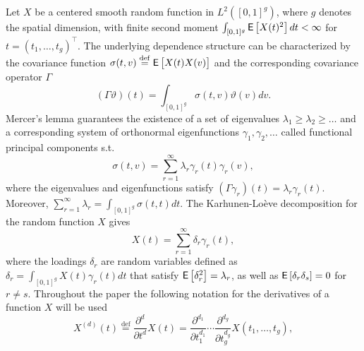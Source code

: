 Let $X$ be a centered smooth random function in $L^2([0,1]^g)$, where $g$ denotes the spatial dimension, with finite second moment $\int_{[0,1]^g} \mathop{\mbox{\sf E}}\left[X(t)^2 \right]dt < \infty$ for $t=(t_1, \ldots, t_g)^{\top}$. %
The underlying dependence structure can  be characterized by the covariance function $\sigma(t,v)\stackrel{\operatorname{def}}{=}\mathop{\mbox{\sf E}}\left[X(t)X(v)\right]$ and
 the corresponding covariance operator $\Gamma$%
 \begin{equation*}
(\Gamma \vartheta)(t)=\int_{[0,1]^g}\sigma(t,v)\vartheta(v)dv.
\end{equation*}
Mercer's lemma guarantees the existence of a set of eigenvalues $\lambda_1\geq \lambda_2\geq \dots$ and a corresponding system of orthonormal eigenfunctions $\gamma_1,\gamma_2,\dots$ called functional principal components s.t.
\begin{equation} \label{op}
\sigma(t,v)= \sum_{r=1}^\infty \lambda_r \gamma_r(t) \gamma_r(v),
\end{equation}
where the eigenvalues and eigenfunctions satisfy 
$(\Gamma \gamma_r)(t)=\lambda_r\gamma_r(t)$. Moreover, $\sum_{r=1}^\infty \lambda_r=\int_{[0,1]^g}\sigma(t,t)dt$.
The Karhunen-Lo\`eve decomposition for the random function $X$ gives
\begin{equation} \label{y}
X(t)=\sum_{r=1}^{\infty} \delta_{r} \gamma_r(t), %
\end{equation}
where the loadings $\delta_{r}$ are random variables defined as $\delta_{r}=\int_{[0,1]^g} X(t) \gamma_r(t) dt$ that satisfy $\mathop{\mbox{\sf E}}\left[\delta_{r}^2\right]=\lambda_r$, as well as $\mathop{\mbox{\sf E}}\left[\delta_{r}\delta_{s}\right]=0$ for $r\neq s$. 
Throughout the paper the following notation for the derivatives of a function $X$ will be used
\begin{equation}
X^{(d)}(t) \stackrel{\operatorname{def}}{=} \frac{\partial^d }{\partial t^{d} } X(t) = \frac{\partial^{d_1} }{\partial t_1^{d_1} } \cdots \frac{\partial^{d_g} }{\partial t_g^{d_g} } X(t_1,\dots,t_g),
\end{equation}
